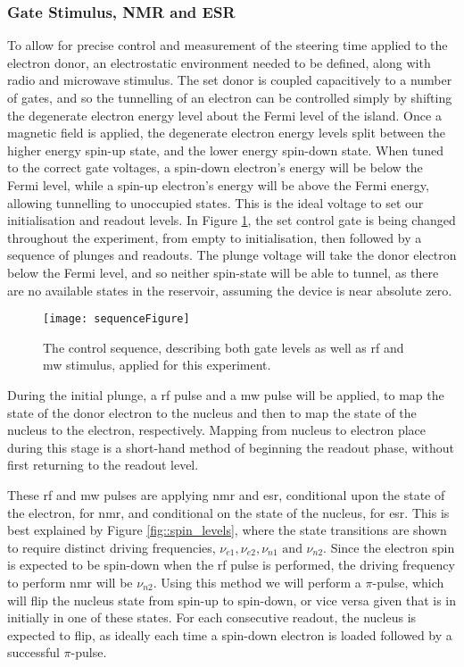 	\subsubsection{Gate Stimulus, NMR and ESR}
		To allow for precise control and measurement of the steering time applied to the electron donor, an electrostatic environment needed to be defined, along with radio and microwave stimulus. The \gls{set} donor is coupled capacitively to a number of gates, and so the tunnelling of an electron can be controlled simply by shifting the degenerate electron energy level about the Fermi level of the island. Once a magnetic field is applied, the degenerate electron energy levels split between the higher energy spin-up state, and the lower energy spin-down state. When tuned to the correct gate voltages, a spin-down electron's energy will be below the Fermi level, while a spin-up electron's energy will be above the Fermi energy, allowing tunnelling to unoccupied states. This is the ideal voltage to set our initialisation and readout levels. In Figure \ref{fig::sequence}, the \gls{set} control gate is being changed throughout the experiment, from empty to initialisation, then followed by a sequence of plunges and readouts. The plunge voltage will take the donor electron below the Fermi level, and so neither spin-state will be able to tunnel, as there are no available states in the reservoir, assuming the device is near absolute zero.
		
		
		\begin{figure}[htbp!]
			\centering
			\texttt{[image: sequenceFigure]}
			\caption{The control sequence, describing both gate levels as well as \gls{rf} and \gls{mw} stimulus, applied for this experiment.}
			\label{fig::sequence}
		\end{figure}
		
		During the initial plunge, a \gls{rf} pulse and a \gls{mw} pulse will be applied, to map the state of the donor electron to the nucleus and then to map the state of the nucleus to the electron, respectively. Mapping from nucleus to electron place during this stage is a short-hand method of beginning the readout phase, without first returning to the readout level.
		
		These \gls{rf} and \gls{mw} pulses are applying \gls{nmr} and \gls{esr}, conditional upon the state of the electron, for \gls{nmr}, and conditional on the state of the nucleus, for \gls{esr}. This is best explained by Figure \ref{fig::spin_levels}, where the state transitions are shown to require distinct driving frequencies, $\nu_{e1}, \nu_{e2}, \nu_{n1} \textrm{ and } \nu_{n2}$. Since the electron spin is expected to be spin-down when the \gls{rf} pulse is performed, the driving frequency to perform \gls{nmr} will be $\nu_{n2}$. Using this method we will perform a $\pi$-pulse, which will flip the nucleus state from spin-up to spin-down, or vice versa given that is in initially in one of these states. For each consecutive readout, the nucleus is expected to flip, as ideally each time a spin-down electron is loaded followed by a successful $\pi$-pulse.
		
